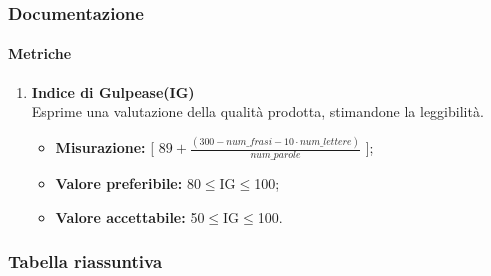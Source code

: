 	\subsubsection{Documentazione}
		\paragraph{Metriche} 
		\begin{enumerate}
		\item[]
			\textbf{Indice di Gulpease(IG)}\\
			Esprime una valutazione della qualità prodotta, stimandone la leggibilità.
			\begin{itemize}
				\item \textbf{Misurazione:} [ $89+ \frac{(300-num\_frasi-10\cdot num\_lettere)}{num\_parole}$ ];
				\item \textbf{Valore preferibile:} 80$\leq$IG$\leq$100;
				\item \textbf{Valore accettabile:} 50$\leq$IG$\leq$100.
			\end{itemize}
		\end{enumerate}
	
\subsubsection{Tabella riassuntiva}

